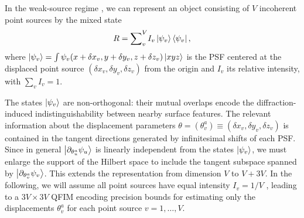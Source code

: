 \documentclass[reprint,amsmath,amssymb,aps,prl,floatfix,groupedaddress,superscriptaddress]{revtex4-2}
\begin{document}
In the weak-source regime \cite{tsang2016quantum}, we can represent an object consisting of $V$ incoherent point sources by the mixed state
\begin{align} \label{eq:incoherent_ensemble}
    R = {\sum}_v^V I_v \ket{\psi_v}\bra{\psi_v},
\end{align}
where $\ket{\psi_v} = \int \psi_v (x+\delta x_v,y+\delta y_v,z+\delta z_v) \ket{xyz}$ is the PSF centered at the displaced point source $(\delta x_v,\delta y_v,\delta z_v)$ from the origin and $I_v$ its relative intensity, with $\sum_v I_v=1$.

The states ${\ket{\psi_v}}$ are non-orthogonal: their mutual overlaps encode the diffraction-induced indistinguishability between nearby surface features. %
The relevant information about the displacement parameters $\theta = (\theta_v^a) \equiv (\delta x_v,\delta y_v,\delta z_v)$ is contained in the tangent directions generated by infinitesimal shifts of each PSF. %
Since in general $\ket{\partial_{\theta_u^a}\psi_u}$ is linearly independent from the states $\ket{\psi_v}$,%
we must  enlarge the support of the Hilbert space to include the tangent subspace spanned by ${\ket{\partial_{\theta_v^a}\psi_v}}$. This extends the representation from dimension $V$ to $V+3V$.
In the following, we will assume all point sources have equal intensity $I_v=1/V$ \cite{noteintensity}, leading to a  $3V \times 3V$ QFIM encoding precision bounds for estimating only the  displacements $\theta_v^a$ for each point source $v=1,\ldots,V$.
\end{document}
